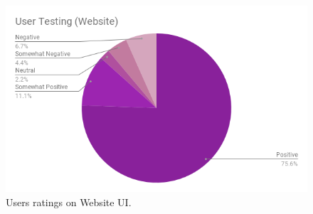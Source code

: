 \documentclass[a4paper]{article}
\begin{document}
\begin{center}
\begin{figure}[H]
  \includegraphics[width=\linewidth]{ease-web.png}
  \caption{Users ratings on Website UI.}\label{fig:awesome_image1}
\endminipage
\newline
\end{figure}

\end{center}
  
\end{document}
